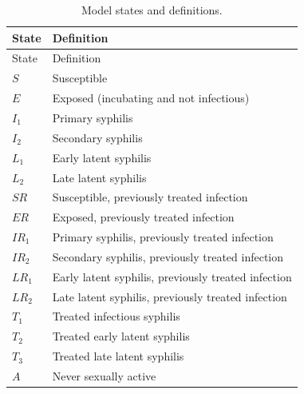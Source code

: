 \documentclass[a4paper]{article}
\begin{document}
\label{sec:params}
	\begin{longtable}[c]  {p{1.5cm}p{9cm}}
    \caption{Model states and definitions. \label{states}}\\
    \hline
    State & Definition\\
	\hline
    \endfirsthead
    
    \hline
    State & Definition\\
	\hline
    \endhead
    
    \hline
    \endfoot
    
    \hline
    \endlastfoot
    
    $S$	& Susceptible\\
    $E$ & Exposed (incubating and not infectious)\\
    $I_1$ & Primary syphilis\\
    $I_2$ & Secondary syphilis\\
    $L_1$ & Early latent syphilis\\
    $L_2$ & Late latent syphilis\\
    $SR$	& Susceptible, previously treated infection\\
    $ER$	& Exposed, previously treated infection\\
    $IR_1$	& Primary syphilis, previously treated infection\\
    $IR_2$	& Secondary syphilis, previously treated infection\\
    $LR_1$	& Early latent syphilis, previously treated infection\\
    $LR_2$	& Late latent syphilis, previously treated infection\\
    $T_1$ & Treated infectious syphilis\\
    $T_2$ & Treated early latent syphilis\\
    $T_3$ & Treated late latent syphilis\\
    $A$ & Never sexually active\\
     
	\end{longtable} 
\newpage
\end{document}
